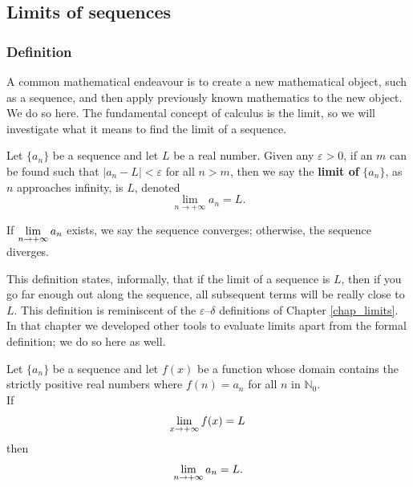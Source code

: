 \subsection{Limits of sequences}
\subsubsection{Definition}
A common mathematical endeavour is to create a new mathematical object, such as a sequence, and then apply previously known mathematics to the new object. We do so here. The fundamental concept of calculus is the limit, so we will investigate what it means to find the limit of a sequence.

\pagebreak

\begin{definition}\label{def:seq_limit}
Let $\{a_n\}$ be a sequence and let $L$ be a real number. Given any $\varepsilon>0$, if an $m$ can be found such that $|a_n-L|<\varepsilon$ for all $n>m$, then we say the \textbf{limit of} $\{a_n\}$, as $n$ approaches infinity, is $L$, denoted $$\lim_{n\to+\infty}a_n = L.$$

If $\displaystyle\lim_{n\to+\infty} a_n$ exists, we say the sequence converges; otherwise, the sequence diverges.
\end{definition}


This definition states, informally, that if the limit of a sequence is $L$, then if you go far enough out along the sequence, all subsequent terms will be really close to $L$. This definition is reminiscent of the $\varepsilon$--$\delta$ definitions of Chapter \ref{chap_limits}. In that chapter we developed other tools to evaluate limits apart from the formal definition; we do so here as well.


\begin{theorem}\label{thm:seq_limit}
Let $\{a_n\}$ be a sequence and let $f(x)$ be a function whose domain contains the strictly positive real numbers where $f(n) = a_n$ for all $n$ in $\mathbb{N}_0$. \\

If
$$\displaystyle \lim_{x\to+\infty} f(x) = L\,$$
then 
$$\displaystyle\lim_{n\to+\infty} a_n = L.$$
\end{theorem}

